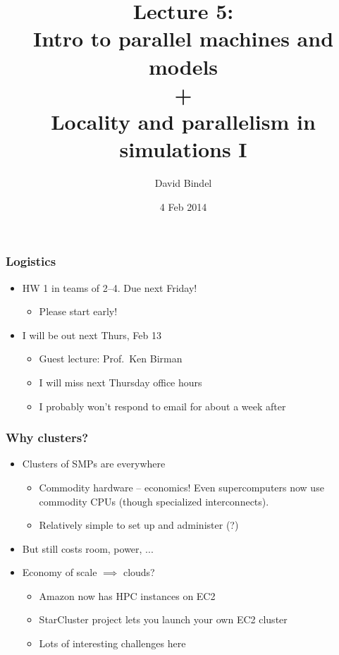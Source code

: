\documentclass{beamer}
\title[CS 5220, Spring 2014]{Lecture 5: \\
  Intro to parallel machines and models \\
  + \\
  Locality and parallelism in simulations I}
\author[]{David Bindel} \date[]{4 Feb 2014}
\begin{document}
\begin{frame}
  \titlepage
\end{frame}


\begin{frame}
  \frametitle{Logistics}
  
  \begin{itemize}
  \item HW 1 in teams of 2--4.  Due next Friday!
    \begin{itemize}
    \item Please start early!
    \end{itemize}
  \item I will be out next Thurs, Feb 13
    \begin{itemize}
    \item Guest lecture: Prof.~Ken Birman
    \item I will miss next Thursday office hours
    \item I probably won't respond to email for about a week after
    \end{itemize}
  \end{itemize}
\end{frame}


\begin{frame}
  \frametitle{Why clusters?}

  \begin{itemize}
  \item Clusters of SMPs are everywhere
    \begin{itemize}
    \item Commodity hardware -- economics!  Even supercomputers
      now use commodity CPUs (though specialized interconnects).
    \item Relatively simple to set up and administer (?)
    \end{itemize}
  \item But still costs room, power, ...
  \item Economy of scale $\implies$ clouds?
    \begin{itemize}
    \item Amazon now has HPC instances on EC2
    \item StarCluster project lets you launch your own EC2 cluster
    \item Lots of interesting challenges here
    \end{itemize}
  \end{itemize}
\end{frame}
\end{document}
